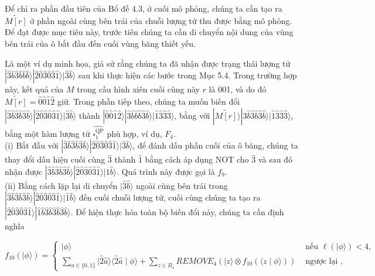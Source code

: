 \documentclass[10pt]{article}
\begin{document}
Để chỉ ra phần đầu tiên của Bổ đề 4.3, ở cuối mô phỏng, chúng ta cần tạo ra $\widetilde{M[r]}$ ở phần ngoài cùng bên trái của chuỗi lượng tử thu được bằng mô phỏng. Để đạt được mục tiêu này, trước tiên chúng ta cần di chuyển nội dung của vùng bên trái của ô bắt đầu đến cuối vùng băng thiết yếu.

Là một ví dụ minh họa, giả sử rằng chúng ta đã nhận được trạng thái lượng tử $|\hat{3} \hat{b} \hat{3} \hat{b} \hat{b} \hat{b}\rangle|\hat{2} \hat{0} \hat{3} \hat{0} \hat{3} \hat{1}\rangle|\hat{3} \hat{b}\rangle$ sau khi thực hiện các bước trong Mục 5.4. Trong trường hợp này, kết quả của $M$ trong cấu hình xiên cuối cùng này $r$ là 001, và do đó $\widetilde{M[r]}=\hat{0} \hat{0} \hat{1} \hat{2}$ giữ. Trong phần tiếp theo, chúng ta muốn biến đổi $|\hat{3} \hat{b} \hat{3} \hat{b} \hat{3} \hat{b}\rangle|\hat{2} \hat{0} \hat{3} \hat{0} \hat{3} \hat{1}\rangle|\hat{3} \hat{b}\rangle$ thành $|\hat{0} \hat{0} \hat{1} \hat{2}\rangle|\hat{3} \hat{b} \hat{b} \hat{b} \hat{3} \hat{b}\rangle|\hat{1} \hat{3} \hat{3} \hat{3}\rangle$, bằng với $|\widetilde{M[r]}\rangle|\hat{3} \hat{b} \hat{3} \hat{b} \hat{3} \hat{b}\rangle|\hat{1} \hat{3} \hat{3} \hat{3}\rangle$, bằng một hàm lượng tử $\widehat{\square_{1}^{\mathrm{QP}}}$ phù hợp, ví dụ, $F_{4}$.\\
(i) Bắt đầu với $|\hat{3} \hat{b} \hat{3} \hat{b} \hat{3} \hat{b}\rangle|\hat{2} \hat{0} \hat{3} \hat{0} \hat{3} \hat{1}\rangle|\hat{3} \hat{b}\rangle$, để đánh dấu phần cuối của ô băng, chúng ta thay đổi dấu hiệu cuối cùng $\hat{3}$ thành $\hat{1}$ bằng cách áp dụng NOT cho $\hat{3}$ và sau đó nhận được $|\hat{3} \hat{b} \hat{3} \hat{b} \hat{3} \hat{b}\rangle|\hat{2} \hat{0} \hat{3} \hat{0} \hat{3} \hat{1}\rangle|\hat{1} \hat{b}\rangle$. Quá trình này được gọi là $f_{9}$.\\
(ii) Bằng cách lặp lại di chuyển $|\hat{3} \hat{b}\rangle$ ngoài cùng bên trái trong $|\hat{3} \hat{b} \hat{3} \hat{b} \hat{3} \hat{b}\rangle|\hat{2} \hat{0} \hat{3} \hat{0} \hat{3} \hat{1}\rangle|\hat{1} \hat{b}\rangle$ đến cuối chuỗi lượng tử, cuối cùng chúng ta tạo ra $|\hat{2} \hat{0} \hat{3} \hat{0} \hat{3} \hat{1}\rangle|\hat{1} \hat{b} \hat{3} \hat{b} \hat{3} \hat{b} \hat{3} \hat{b}\rangle$. Để hiện thực hóa toàn bộ biến đổi này, chúng ta cần định nghĩa

$$
f_{10}(|\phi\rangle)= \begin{cases}|\phi\rangle & \text { nếu } \ell(|\phi\rangle)<4, \\ \sum_{a \in\{0,1\}}|\hat{2} \hat{a}\rangle\langle\hat{2} \hat{a} \mid \phi\rangle+\sum_{z \in B_{4}} R E M O V E_{4}\left(|z\rangle \otimes f_{10}(\langle z \mid \phi\rangle)\right) & \text { ngược lại },\end{cases}
$$
\end{document}
